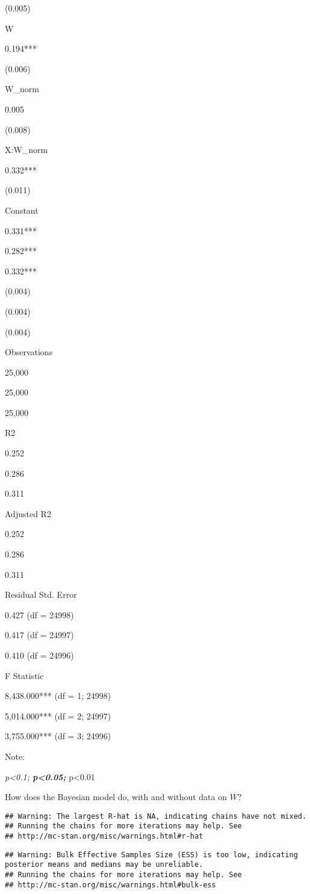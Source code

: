 \documentclass[
  12pt,
]{book}
\begin{document}
(0.005)

W

0.194***

(0.006)

W\_norm

0.005

(0.008)

X:W\_norm

0.332***

(0.011)

Constant

0.331***

0.282***

0.332***

(0.004)

(0.004)

(0.004)

Observations

25,000

25,000

25,000

R2

0.252

0.286

0.311

Adjusted R2

0.252

0.286

0.311

Residual Std. Error

0.427 (df = 24998)

0.417 (df = 24997)

0.410 (df = 24996)

F Statistic

8,438.000*** (df = 1; 24998)

5,014.000*** (df = 2; 24997)

3,755.000*** (df = 3; 24996)

Note:

\emph{p\textless0.1; \textbf{p\textless0.05; }}p\textless0.01

How does the Bayesian model do, with and without data on \(W\)?

\begin{verbatim}
## Warning: The largest R-hat is NA, indicating chains have not mixed.
## Running the chains for more iterations may help. See
## http://mc-stan.org/misc/warnings.html#r-hat
\end{verbatim}

\begin{verbatim}
## Warning: Bulk Effective Samples Size (ESS) is too low, indicating posterior means and medians may be unreliable.
## Running the chains for more iterations may help. See
## http://mc-stan.org/misc/warnings.html#bulk-ess
\end{verbatim}
\end{document}
